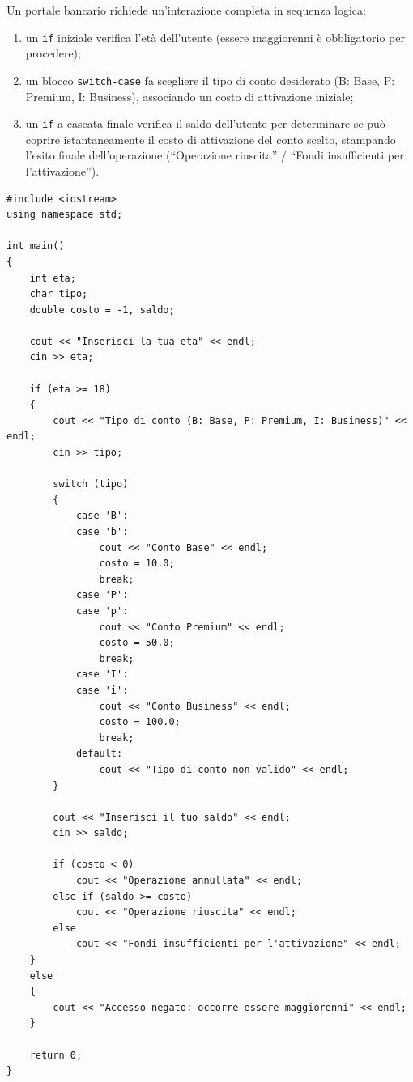 \documentclass[11pt,fleqn]{book}
\begin{document}
\begin{esercizio}[3]
    Un portale bancario richiede un'interazione completa in sequenza logica:
    \begin{enumerate}
        \item un \texttt{if} iniziale verifica l'età dell'utente (essere maggiorenni è obbligatorio per procedere);
        \item un blocco \texttt{switch-case} fa scegliere il tipo di conto desiderato (B: Base, P: Premium, I: Business), associando un costo di attivazione iniziale;
        \item un \texttt{if} a cascata finale verifica il saldo dell'utente per determinare se può coprire istantaneamente il costo di attivazione del conto scelto, stampando l'esito finale dell'operazione (``Operazione riuscita'' / ``Fondi insufficienti per l'attivazione'').
    \end{enumerate}
    \ifsoluzioni
    \solution
    \begin{lstlisting}[style=cpp]
#include <iostream>
using namespace std;

int main()
{
    int eta;
    char tipo;
    double costo = -1, saldo;

    cout << "Inserisci la tua eta" << endl;
    cin >> eta;

    if (eta >= 18)
    {
        cout << "Tipo di conto (B: Base, P: Premium, I: Business)" << endl;
        cin >> tipo;

        switch (tipo)
        {
            case 'B':
            case 'b':
                cout << "Conto Base" << endl;
                costo = 10.0;
                break;
            case 'P':
            case 'p':
                cout << "Conto Premium" << endl;
                costo = 50.0;
                break;
            case 'I':
            case 'i':
                cout << "Conto Business" << endl;
                costo = 100.0;
                break;
            default:
                cout << "Tipo di conto non valido" << endl;
        }

        cout << "Inserisci il tuo saldo" << endl;
        cin >> saldo;

        if (costo < 0)
            cout << "Operazione annullata" << endl;
        else if (saldo >= costo)
            cout << "Operazione riuscita" << endl;
        else
            cout << "Fondi insufficienti per l'attivazione" << endl;
    }
    else
    {
        cout << "Accesso negato: occorre essere maggiorenni" << endl;
    }

    return 0;
}
    \end{lstlisting}
    \fi
\end{esercizio}
\end{document}
